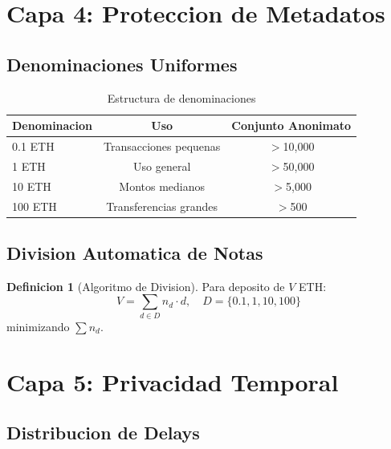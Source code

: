 \documentclass[11pt]{article}
\theoremstyle{definition}
\newtheorem{definicion}{Definicion}[section]
\theoremstyle{plain}
\theoremstyle{remark}
\begin{document}
\section{Capa 4: Proteccion de Metadatos}
\label{sec:layer4}

\subsection{Denominaciones Uniformes}

\begin{table}[H]
\centering
\caption{Estructura de denominaciones}
\label{tab:denominations}
\begin{tabular}{lcc}
\toprule
\textbf{Denominacion} & \textbf{Uso} & \textbf{Conjunto Anonimato} \\
\midrule
0.1 ETH & Transacciones pequenas & $>$10,000 \\
1 ETH & Uso general & $>$50,000 \\
10 ETH & Montos medianos & $>$5,000 \\
100 ETH & Transferencias grandes & $>$500 \\
\bottomrule
\end{tabular}
\end{table}

\subsection{Division Automatica de Notas}

\begin{definicion}[Algoritmo de Division]
Para deposito de $V$ ETH:
\begin{equation}
V = \sum_{d \in D} n_d \cdot d, \quad D = \{0.1, 1, 10, 100\}
\end{equation}
minimizando $\sum n_d$.
\end{definicion}

\section{Capa 5: Privacidad Temporal}
\label{sec:layer5}

\subsection{Distribucion de Delays}
\end{document}
